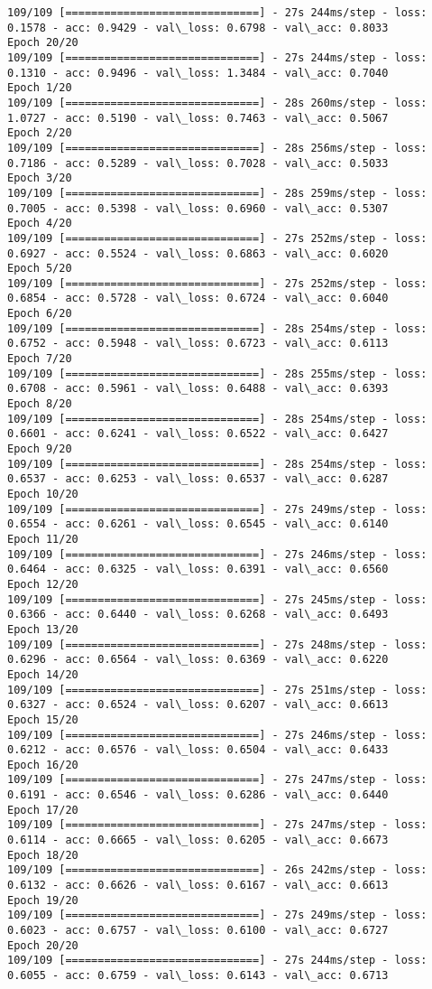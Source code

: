 \documentclass[11pt]{article}
\begin{document}
\begin{Verbatim}[commandchars=\\\{\}]
109/109 [==============================] - 27s 244ms/step - loss: 0.1578 - acc: 0.9429 - val\_loss: 0.6798 - val\_acc: 0.8033
Epoch 20/20
109/109 [==============================] - 27s 244ms/step - loss: 0.1310 - acc: 0.9496 - val\_loss: 1.3484 - val\_acc: 0.7040
Epoch 1/20
109/109 [==============================] - 28s 260ms/step - loss: 1.0727 - acc: 0.5190 - val\_loss: 0.7463 - val\_acc: 0.5067
Epoch 2/20
109/109 [==============================] - 28s 256ms/step - loss: 0.7186 - acc: 0.5289 - val\_loss: 0.7028 - val\_acc: 0.5033
Epoch 3/20
109/109 [==============================] - 28s 259ms/step - loss: 0.7005 - acc: 0.5398 - val\_loss: 0.6960 - val\_acc: 0.5307
Epoch 4/20
109/109 [==============================] - 27s 252ms/step - loss: 0.6927 - acc: 0.5524 - val\_loss: 0.6863 - val\_acc: 0.6020
Epoch 5/20
109/109 [==============================] - 27s 252ms/step - loss: 0.6854 - acc: 0.5728 - val\_loss: 0.6724 - val\_acc: 0.6040
Epoch 6/20
109/109 [==============================] - 28s 254ms/step - loss: 0.6752 - acc: 0.5948 - val\_loss: 0.6723 - val\_acc: 0.6113
Epoch 7/20
109/109 [==============================] - 28s 255ms/step - loss: 0.6708 - acc: 0.5961 - val\_loss: 0.6488 - val\_acc: 0.6393
Epoch 8/20
109/109 [==============================] - 28s 254ms/step - loss: 0.6601 - acc: 0.6241 - val\_loss: 0.6522 - val\_acc: 0.6427
Epoch 9/20
109/109 [==============================] - 28s 254ms/step - loss: 0.6537 - acc: 0.6253 - val\_loss: 0.6537 - val\_acc: 0.6287
Epoch 10/20
109/109 [==============================] - 27s 249ms/step - loss: 0.6554 - acc: 0.6261 - val\_loss: 0.6545 - val\_acc: 0.6140
Epoch 11/20
109/109 [==============================] - 27s 246ms/step - loss: 0.6464 - acc: 0.6325 - val\_loss: 0.6391 - val\_acc: 0.6560
Epoch 12/20
109/109 [==============================] - 27s 245ms/step - loss: 0.6366 - acc: 0.6440 - val\_loss: 0.6268 - val\_acc: 0.6493
Epoch 13/20
109/109 [==============================] - 27s 248ms/step - loss: 0.6296 - acc: 0.6564 - val\_loss: 0.6369 - val\_acc: 0.6220
Epoch 14/20
109/109 [==============================] - 27s 251ms/step - loss: 0.6327 - acc: 0.6524 - val\_loss: 0.6207 - val\_acc: 0.6613
Epoch 15/20
109/109 [==============================] - 27s 246ms/step - loss: 0.6212 - acc: 0.6576 - val\_loss: 0.6504 - val\_acc: 0.6433
Epoch 16/20
109/109 [==============================] - 27s 247ms/step - loss: 0.6191 - acc: 0.6546 - val\_loss: 0.6286 - val\_acc: 0.6440
Epoch 17/20
109/109 [==============================] - 27s 247ms/step - loss: 0.6114 - acc: 0.6665 - val\_loss: 0.6205 - val\_acc: 0.6673
Epoch 18/20
109/109 [==============================] - 26s 242ms/step - loss: 0.6132 - acc: 0.6626 - val\_loss: 0.6167 - val\_acc: 0.6613
Epoch 19/20
109/109 [==============================] - 27s 249ms/step - loss: 0.6023 - acc: 0.6757 - val\_loss: 0.6100 - val\_acc: 0.6727
Epoch 20/20
109/109 [==============================] - 27s 244ms/step - loss: 0.6055 - acc: 0.6759 - val\_loss: 0.6143 - val\_acc: 0.6713

    \end{Verbatim}
\end{document}

